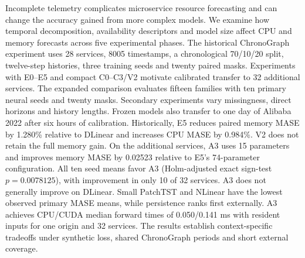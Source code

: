 Incomplete telemetry complicates microservice resource forecasting and can change the accuracy gained from more complex models. We examine how temporal decomposition, availability descriptors and model size affect CPU and memory forecasts across five experimental phases. The historical ChronoGraph experiment uses 28 services, 8005 timestamps, a chronological 70/10/20 split, twelve-step histories, three training seeds and twenty paired masks. Experiments with E0--E5 and compact C0--C3/V2 motivate calibrated transfer to 32 additional services. The expanded comparison evaluates fifteen families with ten primary neural seeds and twenty masks. Secondary experiments vary missingness, direct horizons and history lengths. Frozen models also transfer to one day of Alibaba 2022 after six hours of calibration. Historically, E5 reduces paired memory MASE by 1.280\% relative to DLinear and increases CPU MASE by 0.984\%. V2 does not retain the full memory gain. On the additional services, A3 uses 15 parameters and improves memory MASE by 0.02523 relative to E5's 74-parameter configuration. All ten seed means favor A3 (Holm-adjusted exact sign-test $p=0.0078125$), with improvement in only 10 of 32 services. A3 does not generally improve on DLinear. Small PatchTST and NLinear have the lowest observed primary MASE means, while persistence ranks first externally. A3 achieves CPU/CUDA median forward times of 0.050/0.141 ms with resident inputs for one origin and 32 services. The results establish context-specific tradeoffs under synthetic loss, shared ChronoGraph periods and short external coverage.
